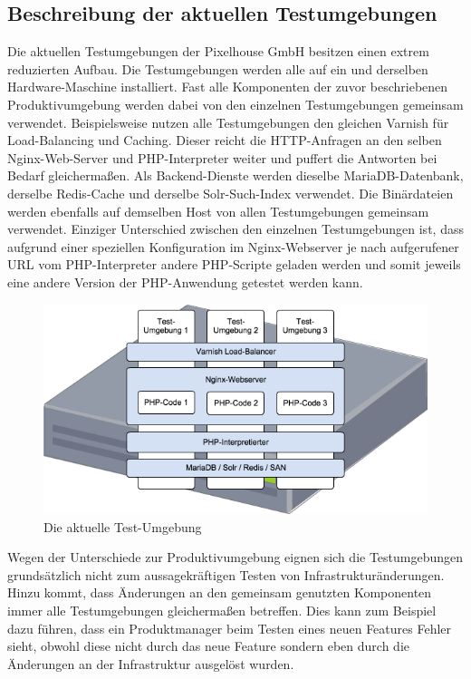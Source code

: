 \subsection{Beschreibung der aktuellen Testumgebungen}

Die aktuellen Testumgebungen der Pixelhouse GmbH besitzen einen extrem reduzierten Aufbau. Die Testumgebungen werden alle auf ein und derselben Hardware-Maschine installiert. Fast alle Komponenten der zuvor beschriebenen Produktivumgebung werden dabei von den einzelnen Testumgebungen gemeinsam verwendet. Beispielsweise nutzen alle Testumgebungen den gleichen Varnish für Load-Balancing und Caching. Dieser reicht die HTTP-Anfragen an den selben Nginx-Web-Server und PHP-Interpreter weiter und puffert die Antworten bei Bedarf gleichermaßen. Als Backend-Dienste werden dieselbe MariaDB-Datenbank, derselbe Redis-Cache und derselbe Solr-Such-Index verwendet. Die Binärdateien werden ebenfalls auf demselben Host von allen Testumgebungen gemeinsam verwendet. Einziger Unterschied zwischen den einzelnen Testumgebungen ist, dass aufgrund einer speziellen Konfiguration im Nginx-Webserver je nach aufgerufener URL vom PHP-Interpreter andere PHP-Scripte geladen werden und somit jeweils eine andere Version der PHP-Anwendung getestet werden kann.

\begin{figure}[!ht]
  \begin{center}
    \includegraphics[width=14cm]{bilder/Aktuelle-Testumgebung.png}
    \caption{Die aktuelle Test-Umgebung}
  \end{center}
\end{figure}

Wegen der Unterschiede zur Produktivumgebung eignen sich die Testumgebungen grundsätzlich nicht zum aussagekräftigen Testen von Infrastrukturänderungen. Hinzu kommt, dass Änderungen an den gemeinsam genutzten Komponenten immer alle Testumgebungen gleichermaßen betreffen. Dies kann zum Beispiel dazu führen, dass ein Produktmanager beim Testen eines neuen Features Fehler sieht, obwohl diese nicht durch das neue Feature sondern eben durch die Änderungen an der Infrastruktur ausgelöst wurden.

